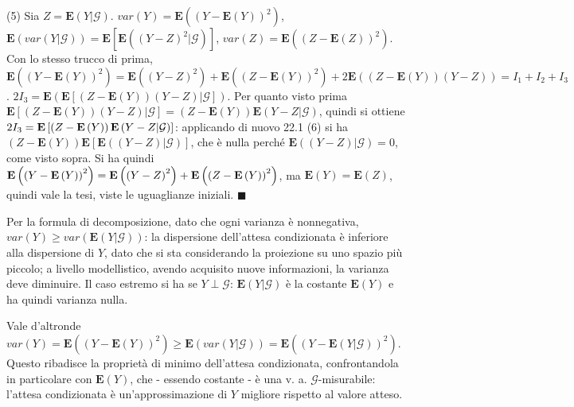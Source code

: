 \documentclass{article}
\begin{document}
(5) Sia $Z=\mathbf{E}\left( Y|\mathcal{G}\right) $. $var\left( Y\right) =%
\mathbf{E}\left( \left( Y-\mathbf{E}\left( Y\right) \right) ^{2}\right) $, $%
\mathbf{E}\left( var\left( Y|\mathcal{G}\right) \right) =\mathbf{E}\left[ 
\mathbf{E}\left( \left( Y-Z\right) ^{2}|\mathcal{G}\right) \right] $, $%
var\left( Z\right) =\mathbf{E}\left( \left( Z-\mathbf{E}\left( Z\right)
\right) ^{2}\right) $. Con lo stesso trucco di prima, $\mathbf{E}\left(
\left( Y-\mathbf{E}\left( Y\right) \right) ^{2}\right) =\mathbf{E}\left(
\left( Y-Z\right) ^{2}\right) +\mathbf{E}\left( \left( Z-\mathbf{E}\left(
Y\right) \right) ^{2}\right) +2\mathbf{E}\left( \left( Z-\mathbf{E}\left(
Y\right) \right) \left( Y-Z\right) \right) =I_{1}+I_{2}+I_{3}$. $2I_{3}=%
\mathbf{E}\left( \mathbf{E}\left[ \left( Z-\mathbf{E}\left( Y\right) \right)
\left( Y-Z\right) |\mathcal{G}\right] \right) $. Per quanto visto prima $%
\mathbf{E}\left[ \left( Z-\mathbf{E}\left( Y\right) \right) \left(
Y-Z\right) |\mathcal{G}\right] =\left( Z-\mathbf{E}\left( Y\right) \right) 
\mathbf{E}\left( Y-Z|\mathcal{G}\right) $, quindi si ottiene $2I_{3}=\mathbf{%
E}\left[ \left( Z-\mathbf{E}\left( Y\right) \right) \mathbf{E}\left( Y-Z|%
\mathcal{G}\right) \right] $: applicando di nuovo 22.1 (6) si ha $\left( Z-%
\mathbf{E}\left( Y\right) \right) \mathbf{E}\left[ \mathbf{E}\left( \left(
Y-Z\right) |\mathcal{G}\right) \right] $, che \`{e} nulla perch\'{e} $%
\mathbf{E}\left( \left( Y-Z\right) |\mathcal{G}\right) =0$, come visto
sopra. Si ha quindi $\mathbf{E}\left( \left( Y-\mathbf{E}\left( Y\right)
\right) ^{2}\right) =\mathbf{E}\left( \left( Y-Z\right) ^{2}\right) +\mathbf{%
E}\left( \left( Z-\mathbf{E}\left( Y\right) \right) ^{2}\right) $, ma $%
\mathbf{E}\left( Y\right) =\mathbf{E}\left( Z\right) $, quindi vale la tesi,
viste le uguaglianze iniziali. $\blacksquare $

Per la formula di decomposizione, dato che ogni varianza \`{e} nonnegativa, $%
var\left( Y\right) \geq var\left( \mathbf{E}\left( Y|\mathcal{G}\right)
\right) $: la dispersione dell'attesa condizionata \`{e} inferiore alla
dispersione di $Y$, dato che si sta considerando la proiezione su uno spazio
pi\`{u} piccolo; a livello modellistico, avendo acquisito nuove
informazioni, la varianza deve diminuire. Il caso estremo si ha se $Y\perp 
\mathcal{G}$: $\mathbf{E}\left( Y|\mathcal{G}\right) $ \`{e} la costante $%
\mathbf{E}\left( Y\right) $ e ha quindi varianza nulla.

Vale d'altronde $var\left( Y\right) =\mathbf{E}\left( \left( Y-\mathbf{E}%
\left( Y\right) \right) ^{2}\right) \geq \mathbf{E}\left( var\left( Y|%
\mathcal{G}\right) \right) =\mathbf{E}\left( \left( Y-\mathbf{E}\left( Y|%
\mathcal{G}\right) \right) ^{2}\right) $. Questo ribadisce la propriet\`{a}
di minimo dell'attesa condizionata, confrontandola in particolare con $%
\mathbf{E}\left( Y\right) $, che - essendo costante - \`{e} una v. a. $%
\mathcal{G}$-misurabile: l'attesa condizionata \`{e} un'approssimazione di $%
Y $ migliore rispetto al valore atteso.
\end{document}
